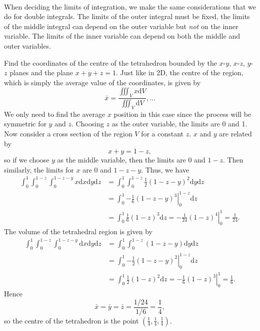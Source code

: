 \documentclass[../multivariate_calculus.tex]{subfiles}
\begin{document}
        \paragraph{}
        When deciding the limits of integration, we make the same considerations that we do for double integrals.
        The limits of the outer integral must be fixed, the limits of the middle integral can depend on the outer variable but \textit{not} on the inner variable.
        The limits of the inner variable can depend on both the middle and outer variables.
        \begin{example}
            Find the coordinates of the centre of the tetrahedron bounded by the $x$-$y$, $x$-$z$, $y$-$z$ planes and the plane $x+y+z=1$.
            Just like in 2D, the centre of the region, which is simply the average value of the coordinates, is given by
            \begin{equation}
                \bar{x}=\frac{\iiint_V x\mathrm{d}V}{\iiint_V \mathrm{d}V},\dots
            \end{equation}
            We only need to find the average $x$ position in this case since the process will be symmetric for $y$ and $z$.
            Choosing $z$ as the outer variable, the limits are 0 and 1.
            Now consider a cross section of the region $V$ for a constant $z$.
            $x$ and $y$ are related by
            \begin{equation}
                x+y=1-z,
            \end{equation}
            so if we choose $y$ as the middle variable, then the limits are 0 and $1-z$.
            Then similarly, the limits for $x$ are 0 and $1-z-y$.
            Thus, we have
            \begin{align}
                \int_0^1\int_0^{1-z}\int_0^{1-z-y}x\mathrm{d}x\mathrm{d}y\mathrm{d}z&=\int_0^1\int_0^{1-z}\frac{1}{2}(1-z-y)^2\mathrm{d}y\mathrm{d}z\\
                &=\int_0^1\left.-\frac{1}{6}(1-z-y)^3\right|_0^{1-z}\mathrm{d}z\\
                &=\int_0^1\frac{1}{6}(1-z)^3\mathrm{d}z=\left.-\frac{1}{24}(1-z)^4\right|_0^1=\frac{1}{24}.
            \end{align}
            The volume of the tetrahedral region is given by
            \begin{align}
                \int_0^1\int_0^{1-z}\int_0^{1-z-y}\mathrm{d}x\mathrm{d}y\mathrm{d}z&=\int_0^1\int_0^{1-z}(1-z-y)\mathrm{d}y\mathrm{d}z\\
                &=\int_0^1\left.-\frac{1}{2}(1-z-y)^2\right|_0^{1-z}\mathrm{d}z\\
                &=\int_0^1\frac{1}{2}(1-z)^2\mathrm{d}z=\left.-\frac{1}{6}(1-z)^3\right|_0^1=\frac{1}{6}.
            \end{align}
            Hence
            \begin{equation}
                \bar{x}=\bar{y}=\bar{z}=\frac{1/24}{1/6}=\frac{1}{4},
            \end{equation}
            so the centre of the tetrahedron is the point $\left(\frac{1}{4},\frac{1}{4},\frac{1}{4}\right)$.
        \end{example}
\end{document}
